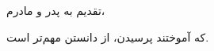 %
\begin{acknowledgementpage}

\vspace{1.5cm}

{\nastaliq
{
تقدیم به پدر و مادرم،

که آموختند پرسیدن، از دانستن مهم‌تر است.
}}
\end{acknowledgementpage}
\newpage
